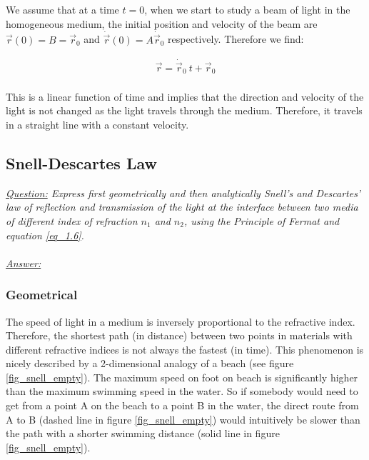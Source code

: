 \documentclass{article}
\begin{document}
We assume that at a time $t=0$, when we start to study a beam of light in the homogeneous medium, the initial position and velocity of the beam are $\vec{r}(0) = B = \vec{r}_0$ and  $ \dot{\vec{r}}(0) = A  \dot{\vec{r}}_0$ respectively. Therefore we find:

\begin{align*}
	 \vec{r} = \dot{\vec{r}}_0 \: t + \vec{r}_0
\end{align*} \\


This is a linear function of time and implies that the direction and velocity of the light is not changed as the light travels through the medium. Therefore, it travels in a straight line with a constant velocity.\\

\newpage
\subsection{Snell-Descartes Law}

\textit{\underline{Question:} Express first geometrically and then analytically Snell's and Descartes' law of reflection and transmission of the light at the interface between two media of different index of refraction $n_1$ and $n_2$, using the Principle of Fermat and equation \ref{eq_1.6}.}\\
\\
\textit{\underline{Answer:}} \\
\subsubsection{Geometrical}
The speed of light in a medium is inversely proportional to the refractive index. Therefore, the shortest path (in distance) between two points in materials with different refractive indices is not always the fastest (in time). This phenomenon is nicely described by a 2-dimensional analogy of a beach (see figure \ref{fig_snell_empty}). The maximum speed on foot on beach is significantly higher than the maximum swimming speed in the water. So if somebody would need to get from a point A on the beach to a point B in the water, the direct route from A to B (dashed line in figure \ref{fig_snell_empty}) would intuitively be slower than the path with a shorter swimming distance (solid line in figure \ref{fig_snell_empty}).
\end{document}
